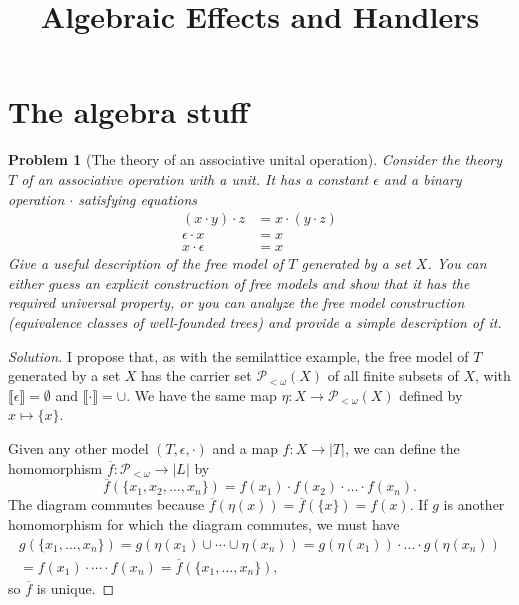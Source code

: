 \documentclass{article}
\title{Algebraic Effects and Handlers}
\author{}
\date{}
\newtheorem{problem}{Problem}[section]}
\begin{document}
    \maketitle

    \section{The algebra stuff}
    \begin{problem}[The theory of an associative unital operation]
        Consider the theory $T$ of an associative operation with a unit.
        It has a constant $\epsilon$ and a binary operation $\cdot$
        satisfying equations
        \begin{align*}
            (x \cdot y) \cdot z &= x \cdot (y \cdot z) \\
            \epsilon \cdot x &= x \\
            x \cdot \epsilon &= x
        \end{align*}
        Give a useful description of the free model of $T$ generated by a
        set $X$. You can either guess an explicit construction of free
        models and show that it has the required universal property, or you can
        analyze the free model construction (equivalence classes of well-founded
        trees) and provide a simple description of it.
    \end{problem}
    \begin{proof}[Solution]
        I propose that, as with the semilattice example, the free model of $T$
        generated by a set $X$ has the carrier set $\mathcal{P}_{<\omega}(X)$ of
        all finite subsets of $X$, with $\llbracket\epsilon\rrbracket=\emptyset$
        and $\llbracket\cdot\rrbracket=\cup$. We have the same map $\eta : X\rightarrow
        \mathcal{P}_{<\omega}(X)$ defined by $x\mapsto \{x\}$.

        Given any other model $(T,\epsilon,\cdot)$ and a map $f : X\rightarrow
        |T|$, we can define the homomorphism $\overline{f}:
        \mathcal{P}_{<\omega}\rightarrow |L|$ by
        \[
            \overline{f}(\{x_1,x_2,\dots,x_n\})=f(x_1)\cdot f(x_2)\cdot \dots
            \cdot f(x_n).
        \]
        The diagram commutes because
        $\overline{f}(\eta(x))=\overline{f}(\{x\})=f(x)$. If $g$ is another
        homomorphism for which the diagram commutes, we must have
        \begin{align*}
            g(\{x_1,\dots,x_n\})=g(\eta(x_1)\cup\cdots\cup\eta(x_n))=g(\eta(x_1))\cdot\dots\cdot
            g(\eta(x_n)) \\
            = f(x_1)\cdot\cdots\cdot f(x_n)=\overline{f}(\{x_1,\dots,x_n\}),
        \end{align*}
        so $\overline{f}$ is unique.
    \end{proof}
\end{document}
